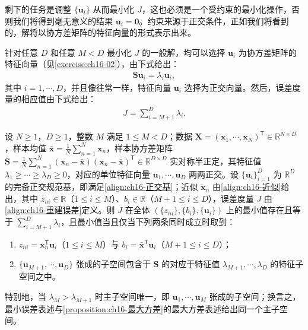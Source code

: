 \documentclass[../../main.tex]{subfiles}
\begin{document}
剩下的任务是调整 $\{\bm{u}_i\}$ 从而最小化 $J$，这也必须是一个受约束的最小化操作，否则我们将得到毫无意义的结果 $\bm{u}_i=\bm{0}$。约束来源于正交条件，正如我们将看到的，解将以协方差矩阵的特征向量的形式表示出来。

针对任意 $D$ 和任意 $M<D$ 最小化 $J$ 的一般解，均可以选择 $\bm{u}_i$ 为协方差矩阵的特征向量（见\cref{exercise:ch16-02}），由下式给出：
\begin{align}
  \bm{S}\bm{u}_i=\lambda_i\bm{u}_i,
  \label{align:ch16-特征方程全}
\end{align}
其中 $i=1,\cdots,D$，并且像往常一样，特征向量 $\bm{u}_i$ 选择为正交向量。然后，误差度量的相应值由下式给出：
\begin{align}
  J=\sum_{i=M+1}^{D}\lambda_i.
  \label{align:ch16-误差最小值}
\end{align}

\begin{proposition}[最小误差表述与最大方差表述的等价性]\label{proposition:ch16-最小误差}
设 $N\geqslant1$，$D\geqslant1$，整数 $M$ 满足 $1\leqslant M<D$；数据 $\bm{X}=(\bm{x}_1,\cdots,\bm{x}_N)^{\mathsf T}\in\mathbb{R}^{N\times D}$，样本均值 $\bar{\bm{x}}=\frac{1}{N}\sum_{n=1}^{N}\bm{x}_n$，样本协方差矩阵 $\bm{S}=\frac{1}{N}\sum_{n=1}^{N}(\bm{x}_n-\bar{\bm{x}})(\bm{x}_n-\bar{\bm{x}})^{\mathsf T}\in\mathbb{R}^{D\times D}$ 实对称半正定，其特征值 $\lambda_1\geqslant\cdots\geqslant\lambda_D\geqslant0$，对应的单位特征向量 $\bm{u}_1,\cdots,\bm{u}_D$ 两两正交。设 $\{\bm{u}_i\}_{i=1}^{D}$ 为 $\mathbb{R}^{D}$ 的完备正交规范基，即满足\eqref{align:ch16-正交基}；近似 $\tilde{\bm{x}}_n$ 由\eqref{align:ch16-近似}给出，其中 $z_{ni}\in\mathbb{R}$（$1\leqslant i\leqslant M$）、$b_i\in\mathbb{R}$（$M+1\leqslant i\leqslant D$），误差度量 $J$ 由\eqref{align:ch16-重建误差}定义。则 $J$ 在全体 $(\{z_{ni}\},\{b_i\},\{\bm{u}_i\})$ 上的最小值存在且等于 $\sum_{i=M+1}^{D}\lambda_i$，且最小值当且仅当下列两条同时成立时取到：
\begin{enumerate}
\item $z_{ni}=\bm{x}_n^{\mathsf T}\bm{u}_i$（$1\leqslant i\leqslant M$）与 $b_i=\bar{\bm{x}}^{\mathsf T}\bm{u}_i$（$M+1\leqslant i\leqslant D$）；
\item $\{\bm{u}_{M+1},\cdots,\bm{u}_D\}$ 张成的子空间包含于 $\bm{S}$ 的对应于特征值 $\lambda_{M+1},\cdots,\lambda_D$ 的特征子空间之中。
\end{enumerate}
特别地，当 $\lambda_M>\lambda_{M+1}$ 时主子空间唯一，即 $\bm{u}_1,\cdots,\bm{u}_M$ 张成的子空间；换言之，最小误差表述与\cref{proposition:ch16-最大方差}的最大方差表述给出同一个主子空间。
\end{proposition}
\end{document}
